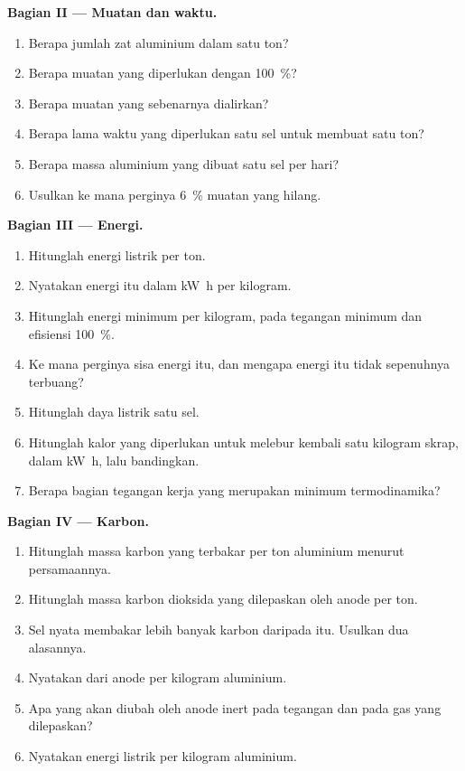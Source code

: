 \begin{problem}
\medskip
\noindent\textbf{Bagian II --- Muatan dan waktu.}
\begin{enumerate}[resume]
  \item Berapa jumlah zat aluminium dalam satu ton?
  \item Berapa muatan yang diperlukan dengan  100~\%?
  \item Berapa muatan yang sebenarnya dialirkan?
  \item Berapa lama waktu yang diperlukan satu sel untuk membuat satu ton?
  \item Berapa massa aluminium yang dibuat satu sel per hari?
  \item Usulkan ke mana perginya 6~\% muatan yang hilang.
\end{enumerate}

\medskip
\noindent\textbf{Bagian III --- Energi.}
\begin{enumerate}[resume]
  \item Hitunglah energi listrik per ton.
  \item Nyatakan energi itu dalam \unit{kW.h} per kilogram.
  \item Hitunglah energi minimum per kilogram, pada tegangan minimum dan
        efisiensi 100~\%.
  \item Ke mana perginya sisa energi itu, dan mengapa energi itu tidak
        sepenuhnya terbuang?
  \item Hitunglah daya listrik satu sel.
  \item Hitunglah kalor yang diperlukan untuk melebur kembali satu kilogram
        skrap, dalam \unit{kW.h}, lalu bandingkan.
  \item Berapa bagian tegangan kerja yang merupakan minimum termodinamika?
\end{enumerate}

\medskip
\noindent\textbf{Bagian IV --- Karbon.}
\begin{enumerate}[resume]
  \item Hitunglah massa karbon yang terbakar per ton aluminium menurut
        persamaannya.
  \item Hitunglah massa karbon dioksida yang dilepaskan oleh anode per ton.
  \item Sel nyata membakar lebih banyak karbon daripada itu. Usulkan dua
        alasannya.
  \item Nyatakan  dari anode per kilogram aluminium.
  \item Apa yang akan diubah oleh anode inert pada tegangan dan pada gas
        yang dilepaskan?
  \item Nyatakan energi listrik per kilogram aluminium.
\end{enumerate}
\end{problem}
